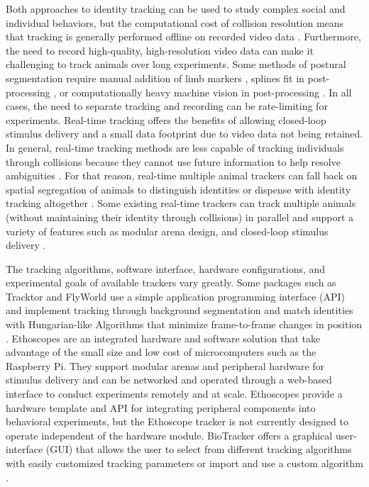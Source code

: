 \documentclass[10pt,letterpaper]{article}
\begin{document}
Both approaches to identity tracking can be used to study complex social and individual behaviors, but the computational cost of collision resolution means that tracking is generally performed offline on recorded video data \cite{Liu_A_2018}. Furthermore, the need to record high-quality, high-resolution video data can make it challenging to track animals over long experiments. Some methods of postural segmentation require manual addition of limb markers \cite{Kain_Leg_2013}, splines fit in post-processing \cite{Uhlmann_FlyLimbTracker_2017}, or computationally heavy machine vision in post-processing \cite{Mathis_DeepLabCut_2018,Pereira_Fast_2018,romero-ferrero_2019}. In all cases, the need to separate tracking and recording can be rate-limiting for experiments. Real-time tracking offers the benefits of allowing closed-loop stimulus delivery and a small data footprint due to video data not being retained. In general, real-time tracking methods are less capable of tracking individuals through collisions because they cannot use future information to help resolve ambiguities \cite{Itskovits_A_2017}. For that reason, real-time multiple animal trackers can fall back on spatial segregation of animals to distinguish identities or dispense with identity tracking altogether \cite{Liu_A_2018,Scaplen_Automated_2019}. Some existing real-time trackers can track multiple animals (without maintaining their identity through collisions) in parallel and support a variety of features such as modular arena design, and closed-loop stimulus delivery \cite{Geissmann_Ethoscopes_2017,Straw_Multi_2010,Stowers_Virtual_2017,Chagas_The_2017}.

The tracking algorithms, software interface, hardware configurations, and experimental goals of available trackers vary greatly. Some packages such as Tracktor and FlyWorld use a simple application programming interface (API) and implement tracking through background segmentation and match identities with Hungarian-like Algorithms that minimize frame-to-frame changes in position \cite{Kuhn_The_1955,Rodriguez_ToxId_2017,Liu_A_2018}. Ethoscopes are an integrated hardware and software solution that take advantage of the small size and low cost of microcomputers such as the Raspberry Pi. They support modular arenas and peripheral hardware for stimulus delivery \cite{Geissmann_Ethoscopes_2017} and can be networked and operated through a web-based interface to conduct experiments remotely and at scale. Ethoscopes provide a hardware template and API for integrating peripheral components into behavioral experiments, but the Ethoscope tracker is not currently designed to operate independent of the hardware module. BioTracker offers a graphical user-interface (GUI) that allows the user to select from different tracking algorithms with easily customized tracking parameters or import and use a custom algorithm \cite{Mnck_BioTracker_2018}. 
\end{document}
